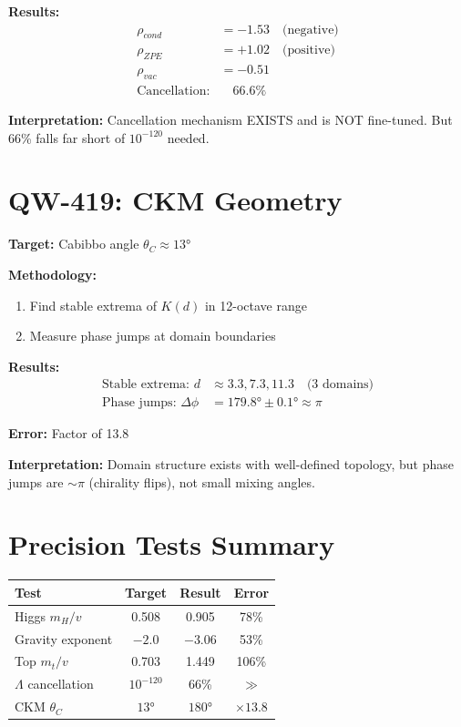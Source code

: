 \documentclass[11pt,a4paper]{book}
\theoremstyle{remark}
\begin{document}
\textbf{Results:}
\begin{align}
\rho_{cond} &= -1.53 \quad \text{(negative)} \\
\rho_{ZPE} &= +1.02 \quad \text{(positive)} \\
\rho_{vac} &= -0.51 \\
\text{Cancellation:} &\quad \mathbf{66.6\%}
\end{align}

\textbf{Interpretation:} Cancellation mechanism EXISTS and is NOT fine-tuned. But 66\% falls far short of $10^{-120}$ needed.

\section{QW-419: CKM Geometry}

\textbf{Target:} Cabibbo angle $\theta_C \approx 13°$

\textbf{Methodology:}
\begin{enumerate}
    \item Find stable extrema of $K(d)$ in 12-octave range
    \item Measure phase jumps at domain boundaries
\end{enumerate}

\textbf{Results:}
\begin{align}
\text{Stable extrema: } d &\approx 3.3, 7.3, 11.3 \quad \text{(3 domains)} \\
\text{Phase jumps: } \Delta\phi &= 179.8° \pm 0.1° \approx \pi
\end{align}

\textbf{Error:} Factor of 13.8

\textbf{Interpretation:} Domain structure exists with well-defined topology, but phase jumps are $\sim\pi$ (chirality flips), not small mixing angles.

\section{Precision Tests Summary}

\begin{center}
\begin{tabular}{|l|c|c|c|}
\hline
\textbf{Test} & \textbf{Target} & \textbf{Result} & \textbf{Error} \\
\hline
Higgs $m_H/v$ & 0.508 & 0.905 & 78\% \\
Gravity exponent & $-2.0$ & $-3.06$ & 53\% \\
Top $m_t/v$ & 0.703 & 1.449 & 106\% \\
$\Lambda$ cancellation & $10^{-120}$ & 66\% & $\gg$ \\
CKM $\theta_C$ & $13°$ & $180°$ & $\times 13.8$ \\
\hline
\end{tabular}
\end{center}
\end{document}
